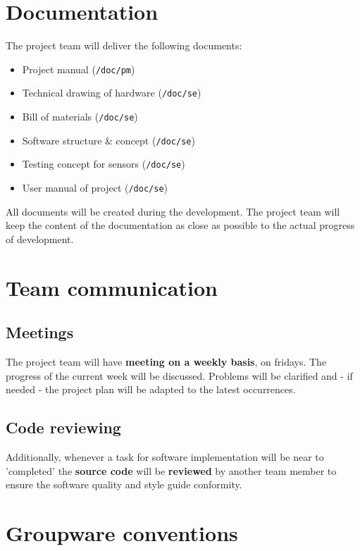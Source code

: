 \section{Documentation}
\label{sec:work:docu}
The project team will deliver the following documents:
\begin{itemize}
	\item Project manual (\texttt{/doc/pm})
	\item Technical drawing of hardware (\texttt{/doc/se})
	\item Bill of materials (\texttt{/doc/se})
	\item Software structure \& concept (\texttt{/doc/se})
	\item Testing concept for sensors (\texttt{/doc/se})
	\item User manual of project (\texttt{/doc/se})
\end{itemize}
All documents will be created during the development. The project team will keep the content of the documentation as close as possible to the actual progress of development.

\section{Team communication}
\label{sec:work:comm}

\subsection{Meetings}
The project team will have \textbf{meeting on a weekly basis}, on fridays. The progress of the current week will be discussed. Problems will be clarified and - if needed - the project plan will be adapted to the latest occurrences.

\subsection{Code reviewing}
Additionally, whenever a task for software implementation will be near to 'completed' the \textbf{source code} will be \textbf{reviewed} by another team member to ensure the software quality and style guide conformity.

\section{Groupware conventions}
\label{sec:work:groupware}


